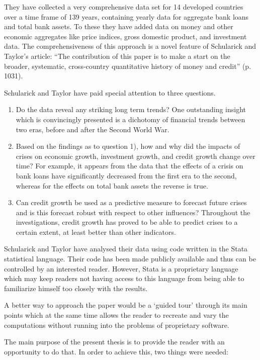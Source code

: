 \documentclass[a4paper,11pt,abstract=on]{scrartcl}
\begin{document}
They have collected a very comprehensive data set for 14 developed countries over a time frame of 139 years, containing yearly data for aggregate bank loans and total bank assets. To these they have added data on money and other economic aggregates like price indices, gross domestic product, and investment data. The comprehensiveness of this approach is a novel feature of Schularick and Taylor’s article: “The contribution of this paper is to make a start on the broader, systematic, cross-country quantitative history of money and credit” (p. 1031).

Schularick and Taylor have paid special attention to three questions.

\begin{enumerate}
\item	Do the data reveal any striking long term trends? One outstanding insight which is convincingly presented is a dichotomy of financial trends between two eras, before and after the Second World War.
\item	Based on the findings as to question 1), how and why did the impacts of crises on economic growth, investment growth, and credit growth change over time? For example, it appears from the data that the effects of a crisis on bank loans have significantly decreased from the first era to the second, whereas for the effects on total bank assets the reverse is true.
\item	Can credit growth be used as a predictive measure to forecast future crises and is this forecast robust with respect to other influences? Throughout the investigations, credit growth has proved to be able to predict crises to a certain extent, at least better than other indicators.
\end{enumerate}

Schularick and Taylor have analysed their data using code written in the Stata statistical language. Their code has been made publicly available and thus can be controlled by an interested reader. However, Stata is a proprietary language which may keep readers not having access to this language from being able to familiarize himself too closely with the results.

A better way to approach the paper would be a ‘guided tour’ through its main points which at the same time allows the reader to recreate and vary the computations without running into the problems of proprietary software. 

The main purpose of the present thesis is to provide the reader with an opportunity to do that. In order to achieve this, two things were needed: 
\end{document}
